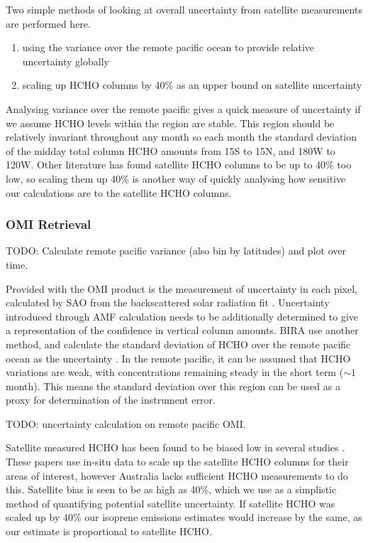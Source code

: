     
    Two simple methods of looking at overall uncertainty from satellite measurements are performed here.
    \begin{enumerate}
      \item using the variance over the remote pacific ocean to provide relative uncertainty globally \parencite[e.g.][]{DeSmedt2012}
      \item scaling up HCHO columns by 40\% as an upper bound on satellite uncertainty
    \end{enumerate}
    Analysing variance over the remote pacific gives a quick measure of uncertainty if we assume HCHO levels within the region are stable.
    This region should be relatively invariant throughout any month so each month the standard deviation of the midday total column HCHO amounts from 15\degr S to 15\degr N, and 180\degr W to 120\degr W.
    Other literature has found satellite HCHO columns to be up to 40\% too low, so scaling them up 40\% is another way of quickly analysing how sensitive our calculations are to the satellite HCHO columns.
    
    
    \subsubsection{OMI Retrieval}
      \label{BioIsop:Uncertainty:Satellite:retrieval}
    TODO: Calculate remote pacific variance (also bin by latitudes) and plot over time. 
    
    
    Provided with the OMI product is the measurement of uncertainty in each pixel, calculated by SAO from the backscattered solar radiation fit \parencite{Abad2015,Abad2016}.
    Uncertainty introduced through AMF calculation needs to be additionally determined to give a representation of the confidence in vertical column amounts.
    BIRA use another method, and calculate the standard deviation of HCHO over the remote pacific ocean as the uncertainty \parencite{DeSmedt2012, DeSmedt2015}.
    In the remote pacific, it can be assumed that HCHO variations are weak, with concentrations remaining steady in the short term ($\sim 1$ month).
    This means the standard deviation over this region can be used as a proxy for determination of the instrument error.
    
    
    TODO: uncertainty calculation on remote pacific OMI.
    
    Satellite measured HCHO has been found to be biased low in several studies \parencite[eg.][]{Zhu2016,DeSmedt2015,Barkley2013}.
    These papers use in-situ data to scale up the satellite HCHO columns for their areas of interest, however Australia lacks sufficient HCHO measurements to do this.
    Satellite bias is seen to be as high as 40\%, which we use as a simplistic method of quantifying potential satellite uncertainty.
    If satellite HCHO was scaled up by 40\% our isoprene emissions estimates would increase by the same, as our estimate is proportional to satellite HCHO.
    
